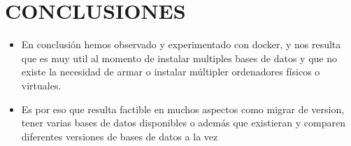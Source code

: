 \section{CONCLUSIONES}
\begin{itemize}
	\item En conclusión hemos observado y experimentado con docker, y nos resulta que es muy util al momento de instalar multiples bases de datos y que no existe la necesidad de armar o instalar múltipler ordenadores físicos o virtuales.
	
	\item Es por eso que resulta factible en muchos aspectos como migrar de version, tener varias bases de datos disponibles o además que existieran y comparen diferentes versiones de bases de datos a la vez
\end{itemize}

\newpage
